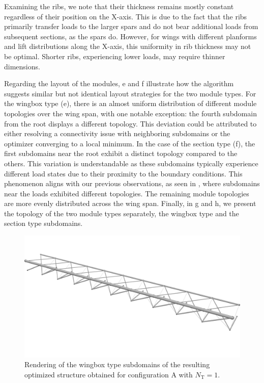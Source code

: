 Examining the ribs, we note that their thickness remains mostly constant regardless of their position on the X-axis. This is due to the fact that the ribs primarily transfer loads to the larger spars and do not bear additional loads from subsequent sections, as the spars do. However, for wings with different planforms and lift distributions along the X-axis, this uniformity in rib thickness may not be optimal. Shorter ribs, experiencing lower loads, may require thinner dimensions. 

Regarding the layout of the modules, e and f illustrate how the algorithm suggests similar but not identical layout strategies for the two module types. For the wingbox type (e), there is an almost uniform distribution of different module topologies over the wing span, with one notable exception: the fourth subdomain from the root displays a different topology. This deviation could be attributed to either resolving a connectivity issue with neighboring subdomains or the optimizer converging to a local minimum. In the case of the section type (f), the first subdomains near the root exhibit a distinct topology compared to the others. This variation is understandable as these subdomains typically experience different load states due to their proximity to the boundary conditions. This phenomenon aligns with our previous observations, as seen in , where subdomains near the loads exhibited different topologies. The remaining module topologies are more evenly distributed across the wing span. Finally, in g and h, we present the topology of the two module types separately, the wingbox type and the section type subdomains.

\begin{figure}
    \centering
    \includegraphics[width=0.8\linewidth]{figures/07_aeronautic/00_NACA_c_1/04_Topology_cell_iso.png}
        \caption{Rendering of the wingbox type subdomains of the resulting optimized structure obtained for configuration A with $N_\text{T}=1$.}
    \label{fig:07_wingbox_a_nt1}
\end{figure}

